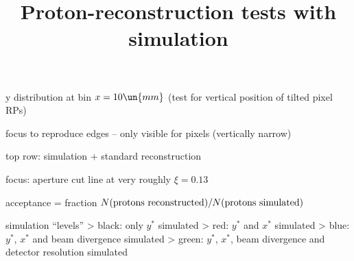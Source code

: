 \centerline{}



\newpage %

\SmallerFonts

\> y distribution at bin $x = 10\un{mm}$ (test for vertical position of tilted pixel RPs)

\> focus to reproduce edges -- only visible for pixels (vertically narrow)

\centerline{}



\newpage %

\centerline{}



\newpage %

\SmallerFonts

\> top row: simulation + standard reconstruction

\> focus: aperture cut line at very roughly $\xi = 0.13$

\centerline{}


\newpage %

\> acceptance = fraction $N(\hbox{protons reconstructed}) / N(\hbox{protons simulated})$

\centerline{}



\newpage %
\title{Proton-reconstruction tests with simulation}

\> simulation ``levels''
\>> black: only $y^*$ simulated
\>> red: $y^*$ and $x^*$ simulated
\>> blue: $y^*$, $x^*$ and beam divergence simulated
\>> green: $y^*$, $x^*$, beam divergence and detector resolution simulated


